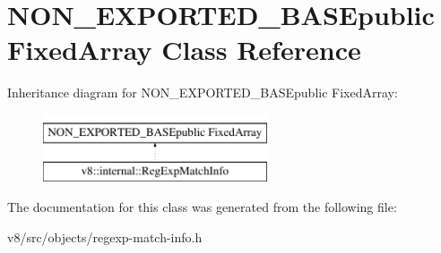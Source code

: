 \hypertarget{classNON__EXPORTED__BASEpublic_01FixedArray}{}\section{N\+O\+N\+\_\+\+E\+X\+P\+O\+R\+T\+E\+D\+\_\+\+B\+A\+S\+Epublic Fixed\+Array Class Reference}
\label{classNON__EXPORTED__BASEpublic_01FixedArray}
Inheritance diagram for N\+O\+N\+\_\+\+E\+X\+P\+O\+R\+T\+E\+D\+\_\+\+B\+A\+S\+Epublic Fixed\+Array\+:\begin{figure}[H]
\begin{center}
\leavevmode
\includegraphics[height=2.000000cm]{classNON__EXPORTED__BASEpublic_01FixedArray}
\end{center}
\end{figure}


The documentation for this class was generated from the following file\+:\begin{DoxyCompactItemize}
\item 
v8/src/objects/regexp-\/match-\/info.\+h\end{DoxyCompactItemize}
